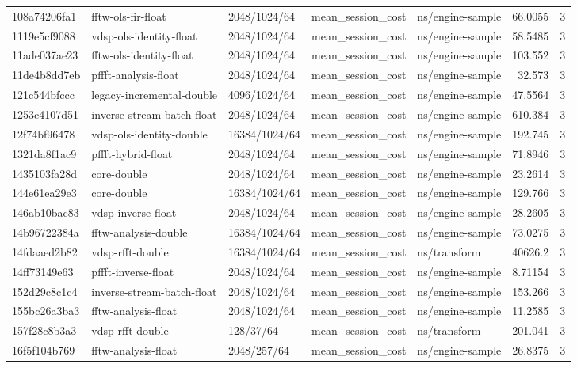 \begin{longtable}{lllllrr}
108a74206fa1 & fftw-ols-fir-float & 2048/1024/64 & mean\_session\_cost & ns/engine-sample & 66.0055 & 3 \\
1119e5cf9088 & vdsp-ols-identity-float & 2048/1024/64 & mean\_session\_cost & ns/engine-sample & 58.5485 & 3 \\
11ade037ae23 & fftw-ols-identity-float & 2048/1024/64 & mean\_session\_cost & ns/engine-sample & 103.552 & 3 \\
11de4b8dd7eb & pffft-analysis-float & 2048/1024/64 & mean\_session\_cost & ns/engine-sample & 32.573 & 3 \\
121c544bfccc & legacy-incremental-double & 4096/1024/64 & mean\_session\_cost & ns/engine-sample & 47.5564 & 3 \\
1253c4107d51 & inverse-stream-batch-float & 2048/1024/64 & mean\_session\_cost & ns/engine-sample & 610.384 & 3 \\
12f74bf96478 & vdsp-ols-identity-double & 16384/1024/64 & mean\_session\_cost & ns/engine-sample & 192.745 & 3 \\
1321da8f1ac9 & pffft-hybrid-float & 2048/1024/64 & mean\_session\_cost & ns/engine-sample & 71.8946 & 3 \\
1435103fa28d & core-double & 2048/1024/64 & mean\_session\_cost & ns/engine-sample & 23.2614 & 3 \\
144e61ea29e3 & core-double & 16384/1024/64 & mean\_session\_cost & ns/engine-sample & 129.766 & 3 \\
146ab10bac83 & vdsp-inverse-float & 2048/1024/64 & mean\_session\_cost & ns/engine-sample & 28.2605 & 3 \\
14b96722384a & fftw-analysis-double & 16384/1024/64 & mean\_session\_cost & ns/engine-sample & 73.0275 & 3 \\
14fdaaed2b82 & vdsp-rfft-double & 16384/1024/64 & mean\_session\_cost & ns/transform & 40626.2 & 3 \\
14ff73149e63 & pffft-inverse-float & 2048/1024/64 & mean\_session\_cost & ns/engine-sample & 8.71154 & 3 \\
152d29c8c1c4 & inverse-stream-batch-float & 2048/1024/64 & mean\_session\_cost & ns/engine-sample & 153.266 & 3 \\
155bc26a3ba3 & fftw-analysis-float & 2048/1024/64 & mean\_session\_cost & ns/engine-sample & 11.2585 & 3 \\
157f28c8b3a3 & vdsp-rfft-double & 128/37/64 & mean\_session\_cost & ns/transform & 201.041 & 3 \\
16f5f104b769 & fftw-analysis-float & 2048/257/64 & mean\_session\_cost & ns/engine-sample & 26.8375 & 3 \\

\end{longtable}
